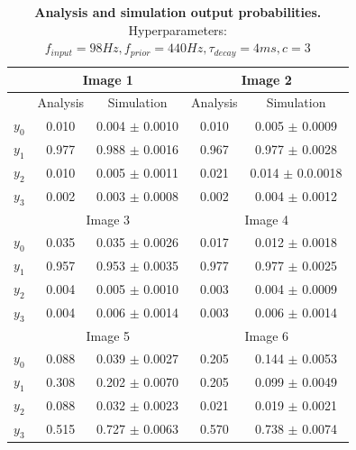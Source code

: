 \begin{table}[]
\centering
\label{tab:1DTrainingEvaluationC3}
\small
\tabcolsep=0.11cm
\begin{tabular}{|c|cc|cc|}
\hline
                       & \multicolumn{2}{c|}{Image 1}                       & \multicolumn{2}{c|}{Image 2}                       \\ \hline
                       & \multicolumn{1}{c|}{Analysis} & Simulation         & \multicolumn{1}{c|}{Analysis} & Simulation         \\ \hline
$y_0$                  & \multicolumn{1}{c|}{0.010}    & 0.004 $\pm$ 0.0010 & \multicolumn{1}{c|}{0.010}    & 0.005 $\pm$ 0.0009 \\ \hline
$y_1$                  & \multicolumn{1}{c|}{0.977}    & 0.988 $\pm$ 0.0016 & \multicolumn{1}{c|}{0.967}    & 0.977 $\pm$ 0.0028 \\ \hline
$y_2$                  & \multicolumn{1}{c|}{0.010}    & 0.005 $\pm$ 0.0011 & \multicolumn{1}{c|}{0.021}    & 0.014 $\pm$ 0.0.0018 \\ \hline
$y_3$                  & \multicolumn{1}{c|}{0.002}    & 0.003 $\pm$ 0.0008 & \multicolumn{1}{c|}{0.002}    & 0.004 $\pm$ 0.0012 \\ \hline
                       & \multicolumn{2}{c|}{Image 3}                       & \multicolumn{2}{c|}{Image 4}                       \\ \hline
$y_0$                  & \multicolumn{1}{c|}{0.035}    & 0.035 $\pm$ 0.0026 & \multicolumn{1}{c|}{0.017}    & 0.012 $\pm$ 0.0018 \\ \hline
$y_1$                  & \multicolumn{1}{c|}{0.957}    & 0.953 $\pm$ 0.0035 & \multicolumn{1}{c|}{0.977}    & 0.977 $\pm$ 0.0025 \\ \hline
$y_2$                  & \multicolumn{1}{c|}{0.004}    & 0.005 $\pm$ 0.0010 & \multicolumn{1}{c|}{0.003}    & 0.004 $\pm$ 0.0009 \\ \hline
$y_3$                  & \multicolumn{1}{c|}{0.004}    & 0.006 $\pm$ 0.0014 & \multicolumn{1}{c|}{0.003}    & 0.006 $\pm$ 0.0014 \\ \hline
						& \multicolumn{2}{c|}{Image 5}                       & \multicolumn{2}{c|}{Image 6}                       \\ \hline
$y_0$                  & \multicolumn{1}{c|}{0.088}    & 0.039 $\pm$ 0.0027 & \multicolumn{1}{c|}{0.205}    & 0.144 $\pm$ 0.0053 \\ \hline
$y_1$                  & \multicolumn{1}{c|}{0.308}    & 0.202 $\pm$ 0.0070 & \multicolumn{1}{c|}{0.205}    & 0.099 $\pm$ 0.0049 \\ \hline
$y_2$                  & \multicolumn{1}{c|}{0.088}    & 0.032 $\pm$ 0.0023 & \multicolumn{1}{c|}{0.021}    & 0.019 $\pm$ 0.0021 \\ \hline
$y_3$                  & \multicolumn{1}{c|}{0.515}    & 0.727 $\pm$ 0.0063 & \multicolumn{1}{c|}{0.570}    & 0.738 $\pm$ 0.0074 \\ \hline
\end{tabular}
\caption{\textbf{Analysis and simulation output probabilities. } Hyperparameters: $f_{input} = 98 Hz, f_{prior} = 440 Hz, \tau_{decay} = 4 ms, c = 3$}
\end{table}

